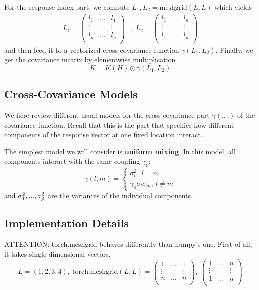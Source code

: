 \documentclass[a4paper,10pt]{article}
\begin{document}
For the response index part, we compute $L_1, L_2=\textrm{meshgrid}\left(L,
L\right)$ which yields
\begin{align*}
    L_1 =  \begin{pmatrix}
        l_1 & \dots & l_1\\
        \vdots &  & \vdots \\
        l_n & \dots & l_n\\
    \end{pmatrix}
    &,~ 
    L_2 =  \begin{pmatrix}
        l_1 & \dots & l_n\\
        \vdots &  & \vdots \\
        l_1 & \dots & l_n\\
    \end{pmatrix}
\end{align*}
and then feed it to a vectorized cross-covariance function $\gamma(L_1, L_2)$.
Finally, we get the covariance matrix by elementwise multiplication
\[
    K = K\left(H\right) \odot \gamma\left(L_1, L_2\right)
\]

\subsection{Cross-Covariance Models}
We here review different usual models for the cross-covariance part $\gamma(.,
.)$ of the covariance function. Recall that this is the part that specifies how
different components of the response vector at one fixed location interact.

\medskip
The simplest model we will consider is \textbf{uniform mixing}. In this model,
all components interact with the same coupling $\gamma_0$:
\begin{equation}
    \gamma(l, m) = \begin{cases} \sigma_l^2,~ l=m\\ 
        \gamma_0\sigma_l\sigma_m,~l\neq m
    \end{cases}
\end{equation}
and $\sigma_1^2, ..., \sigma_{p}^2$ are the variances of the individual
components.

\subsection{Implementation Details}
ATTENTION: torch.meshgrid behaves differently than numpy's one.
First of all, it takes single dimensional vectors.
\[
    L=(1,2,3,4),~ \textrm{torch.meshgrid}(L,L)=
    \begin{pmatrix}
        1 & \dots & 1\\
        \vdots &  & \vdots \\
        n & \dots & n\\
    \end{pmatrix}
    ,~ 
    \begin{pmatrix}
        1 & \dots & n\\
        \vdots &  & \vdots \\
        1 & \dots & n\\
    \end{pmatrix}
\]
\end{document}
